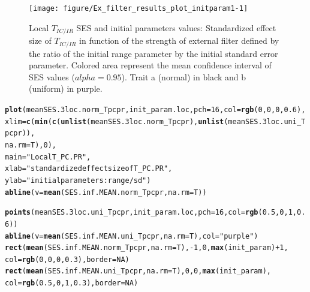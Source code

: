 \documentclass[12pt]{article}\usepackage[]{graphicx}\usepackage[]{color}
\makeatletter
\newcommand{\hlnum}[1]{\textcolor[rgb]{0.686,0.059,0.569}{#1}}%
\newcommand{\hlstr}[1]{\textcolor[rgb]{0.192,0.494,0.8}{#1}}%
\newcommand{\hlopt}[1]{\textcolor[rgb]{0,0,0}{#1}}%
\newcommand{\hlstd}[1]{\textcolor[rgb]{0.345,0.345,0.345}{#1}}%
\newcommand{\hlkwc}[1]{\textcolor[rgb]{0.333,0.667,0.333}{#1}}%
\newcommand{\hlkwd}[1]{\textcolor[rgb]{0.737,0.353,0.396}{\textbf{#1}}}%
\newenvironment{kframe}{%
 \def\at@end@of@kframe{}%
 \ifinner\ifhmode%
  \def\at@end@of@kframe{\end{minipage}}%
  \begin{minipage}{\columnwidth}%
 \fi\fi%
 \def\FrameCommand##1{\hskip\@totalleftmargin \hskip-\fboxsep
 \colorbox{shadecolor}{##1}\hskip-\fboxsep
     \hskip-\linewidth \hskip-\@totalleftmargin \hskip\columnwidth}%
 \MakeFramed {\advance\hsize-\width
   \@totalleftmargin\z@ \linewidth\hsize
   \@setminipage}}%
 {\par\unskip\endMakeFramed%
 \at@end@of@kframe}
\newenvironment{knitrout}{}{} %
\makeatother
\begin{document}
\begin{knitrout}
\begin{figure}
{\centering \texttt{[image: figure/Ex\_filter\_results\_plot\_initparam1-1]} 

}

\caption[Local $T_{IC/IR}$ SES and initial parameters values]{Local $T_{IC/IR}$ SES and initial parameters values: Standardized effect size of $T_{IC/IR}$ in function of the strength of external filter defined by the ratio of the initial range parameter by the initial standard error parameter. Colored area represent the mean confidence interval of SES values ($alpha = 0.95$). Trait a (normal) in black and b (uniform) in purple.\label{fig:Ex_filter_results_plot_initparam1}}
\end{figure}


\end{knitrout}
 
  
\begin{knitrout}\small
{}\color{fgcolor}\begin{kframe}
\begin{alltt}
\hlkwd{plot}\hlstd{(meanSES.3loc.norm_Tpcpr, init_param.loc,} \hlkwc{pch} \hlstd{=} \hlnum{16}\hlstd{,} \hlkwc{col} \hlstd{=} \hlkwd{rgb}\hlstd{(}\hlnum{0}\hlstd{,} \hlnum{0}\hlstd{,} \hlnum{0}\hlstd{,} \hlnum{0.6}\hlstd{),}
     \hlkwc{xlim} \hlstd{=} \hlkwd{c}\hlstd{(}\hlkwd{min}\hlstd{(}\hlkwd{c}\hlstd{(}\hlkwd{unlist}\hlstd{(meanSES.3loc.norm_Tpcpr),} \hlkwd{unlist}\hlstd{(meanSES.3loc.uni_Tpcpr)),}
     \hlkwc{na.rm} \hlstd{= T),} \hlnum{0}\hlstd{),}
     \hlkwc{main} \hlstd{=} \hlstr{"Local T_PC.PR"}\hlstd{,}
     \hlkwc{xlab} \hlstd{=} \hlstr{"standardized effect size of T_PC.PR"}\hlstd{,}
     \hlkwc{ylab} \hlstd{=} \hlstr{"initial parameters: range/sd"}\hlstd{)}
\hlkwd{abline}\hlstd{(}\hlkwc{v} \hlstd{=} \hlkwd{mean}\hlstd{(SES.inf.MEAN.norm_Tpcpr,} \hlkwc{na.rm} \hlstd{= T))}

\hlkwd{points}\hlstd{(meanSES.3loc.uni_Tpcpr, init_param.loc,} \hlkwc{pch} \hlstd{=} \hlnum{16}\hlstd{,} \hlkwc{col} \hlstd{=} \hlkwd{rgb}\hlstd{(}\hlnum{0.5}\hlstd{,} \hlnum{0}\hlstd{,} \hlnum{1}\hlstd{,} \hlnum{0.6}\hlstd{))}
\hlkwd{abline}\hlstd{(}\hlkwc{v} \hlstd{=} \hlkwd{mean}\hlstd{(SES.inf.MEAN.uni_Tpcpr,} \hlkwc{na.rm} \hlstd{= T),} \hlkwc{col} \hlstd{=} \hlstr{"purple"}\hlstd{)}
\hlkwd{rect}\hlstd{(}\hlkwd{mean}\hlstd{(SES.inf.MEAN.norm_Tpcpr,} \hlkwc{na.rm} \hlstd{= T),} \hlopt{-}\hlnum{1}\hlstd{,} \hlnum{0}\hlstd{,} \hlkwd{max}\hlstd{(init_param)} \hlopt{+} \hlnum{1}\hlstd{,}
     \hlkwc{col} \hlstd{=} \hlkwd{rgb}\hlstd{(}\hlnum{0}\hlstd{,} \hlnum{0}\hlstd{,} \hlnum{0}\hlstd{,} \hlnum{0.3}\hlstd{),} \hlkwc{border} \hlstd{=} \hlnum{NA}\hlstd{)}
\hlkwd{rect}\hlstd{(}\hlkwd{mean}\hlstd{(SES.inf.MEAN.uni_Tpcpr,} \hlkwc{na.rm} \hlstd{= T),} \hlnum{0}\hlstd{,} \hlnum{0}\hlstd{,} \hlkwd{max}\hlstd{(init_param),}
     \hlkwc{col} \hlstd{=} \hlkwd{rgb}\hlstd{(}\hlnum{0.5}\hlstd{,} \hlnum{0}\hlstd{,} \hlnum{1}\hlstd{,} \hlnum{0.3}\hlstd{),} \hlkwc{border} \hlstd{=} \hlnum{NA}\hlstd{)}
\end{alltt}
\end{kframe}\begin{figure}


\end{figure}
\end{knitrout}
\end{document}

